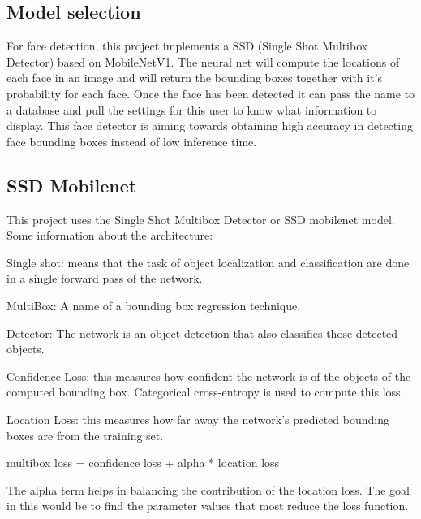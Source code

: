 \documentclass[10pt,twocolumn,letterpaper]{article}
\begin{document}
\subsection{Model selection}

For face detection, this project implements a SSD (Single Shot Multibox Detector) based on MobileNetV1. The neural net will compute the locations of each face in an image and will return the bounding boxes together with it's probability for each face. Once the face has been detected it can pass the name to a database and pull the settings for this user to know what information to display.   This face detector is aiming towards obtaining high accuracy in detecting face bounding boxes instead of low inference time. \cite{face-api}


\subsection{SSD Mobilenet}

This project uses the Single Shot Multibox Detector or SSD mobilenet model. Some information about the architecture: \cite{Muhler}

Single shot:  means that the task of object localization and classification are done in a single forward pass of the network.

MultiBox:  A name of a bounding box regression technique.

Detector:  The network is an object detection that also classifies those detected objects.

Confidence Loss: this measures how confident the network is of the objects of the computed bounding box. Categorical cross-entropy is used to compute this loss.

Location Loss: this measures how far away the network’s predicted bounding boxes are from the training set.

\begin{center} multibox loss = confidence loss + alpha * location loss \end{center}


The alpha term helps in balancing the contribution of the location loss.  The goal in this would be to find the parameter values that most reduce the loss function.
\end{document}

